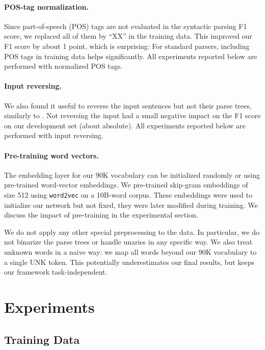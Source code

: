 \documentclass{article} \usepackage{nips15submit_e,times}
\newcommand\citep\cite
\begin{document}
\paragraph{POS-tag normalization.}
Since part-of-speech (POS) tags are not evaluated in the syntactic parsing F1
score, we replaced all of them by ``XX'' in the training data. This improved
our F1 score by about 1 point, which is surprising: For standard parsers,
including POS tags in training data helps significantly. All experiments
reported below are performed with normalized POS tags.

\paragraph{Input reversing.}
We also found it useful to reverse the input sentences but not their parse
trees, similarly to \cite{sutskever14}.
Not reversing the input had a small negative impact on the F1 score on our
development set (about  absolute).
All experiments reported below are performed with input reversing.

\paragraph{Pre-training word vectors.}
The embedding layer for our 90K vocabulary can be initialized randomly or
using pre-trained word-vector embeddings. We pre-trained skip-gram embeddings
of size 512 using \texttt{word2vec} \citep{mikolov2013efficient} on a 10B-word
corpus. These embeddings were used to initialize our network but not fixed,
they were later modified during training. We discuss the impact of pre-training
in the experimental section.

We do not apply any other special preprocessing to the data.
In particular, we do not binarize the parse trees or handle unaries
in any specific way. We also treat unknown words in a naive way:
we map all words beyond our 90K vocabulary to a single UNK token.
This potentially underestimates our final results, but keeps our
framework task-independent.
 \vspace{-3mm}
\section{Experiments}
\label{sec:exp}

\subsection{Training Data}
\end{document}
